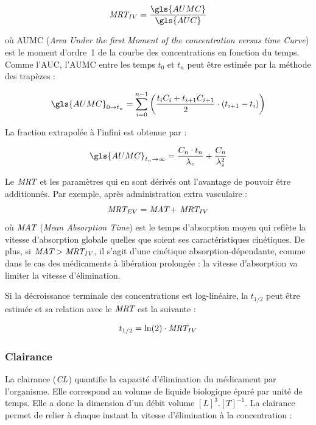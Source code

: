 \begin{equation}
\MRT_{IV} = \frac{\gls{AUMC}}{\gls{AUC}}
\label{eq:6}
\end{equation}

où \gls{AUMC} (\textit{Area Under the first Moment of the concentration versus time Curve}) est le moment d'ordre~1 de la courbe des concentrations en fonction du temps. Comme l'\gls{AUC}, l'\gls{AUMC} entre les temps $t_0$ et $t_n$ peut être estimée par la méthode des trapèzes :

\begin{equation}
\gls{AUMC}_{0 \to t_n} = \sum_{i=0}^{n-1}\left ( \frac{t_i C_i + t_{i+1}C_{i+1}}{2}\cdot \left ( t_{i+1}-t_i \right ) \right )
\label{eq:7}
\end{equation}

La fraction extrapolée à l'infini est obtenue par :

\begin{equation}
\gls{AUMC}_{t_n \to \infty} = \frac{C_n \cdot t_n}{\lambda_z}+\frac{C_n }{\lambda_z^2}
\label{eq:8}
\end{equation}

Le $\operatorname{\textit{MRT}}$ et les paramètres qui en sont dérivés ont l'avantage de pouvoir être additionnés. Par exemple, après administration extra vasculaire :
\begin{equation}
\operatorname{\textit{MRT}}_{EV} = \operatorname{\textit{MAT}} + \, \operatorname{\textit{MRT}}_{IV}
\label{eq:9}
\end{equation}
où $\operatorname{\textit{MAT}}$ (\textit{Mean Absorption Time}) est le temps d'absorption moyen qui reflète la vitesse d'absorption globale quelles que soient ses caractéristiques cinétiques. De plus, si $\operatorname{\textit{MAT}} > \operatorname{\textit{MRT}}_{IV}$, il s'agit d'une cinétique absorption-dépendante, comme dans le cas des médicaments à libération prolongée : la vitesse d'absorption va limiter la vitesse d'élimination.

Si la décroissance terminale des concentrations est log-linéaire, la $t_{1/2}$ peut être estimée et sa relation avec le $\operatorname{\textit{MRT}}$ est la suivante :

\begin{equation}
t_{1/2} = \ln(2)\cdot \operatorname{\textit{MRT}}_{IV}
\label{eq:10}
\end{equation}

\subsubsection{Clairance} 
La clairance ($\operatorname{\textit{CL}}$) quantifie la capacité d'élimination du médicament par l'organisme. Elle correspond au volume de liquide biologique épuré par unité de temps. Elle a donc la dimension d'un débit volume $[L]^3.[T]^{-1}$. La clairance permet de relier à chaque instant la vitesse d'élimination à la concentration :

